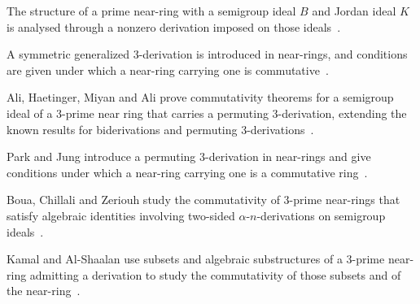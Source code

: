 The structure of a prime near-ring with a semigroup ideal $B$ and Jordan ideal $K$ is analysed through a nonzero derivation imposed on those ideals~\cite{WlStructuralPropertiesOfPrimeNea2019}.

A symmetric generalized 3-derivation is introduced in near-rings, and conditions are given under which a near-ring carrying one is commutative~\cite{WlOnSymmetricGeneralized3Derivat2016}.

Ali, Haetinger, Miyan and Ali prove commutativity theorems for a semigroup ideal of a 3-prime near ring that carries a permuting 3-derivation, extending the known results for biderivations and permuting 3-derivations~\cite{WlSemigroupIdealsAndPermuting3De2015}.

Park and Jung introduce a permuting 3-derivation in near-rings and give conditions under which a near-ring carrying one is a commutative ring~\cite{WlOnPermuting3DerivationsAndComm2010}.

Boua, Chillali and Zeriouh study the commutativity of 3-prime near-rings that satisfy algebraic identities involving two-sided $\alpha$-$n$-derivations on semigroup ideals~\cite{WlDifferentialConditionsForWhich2018}.

Kamal and Al-Shaalan use subsets and algebraic substructures of a 3-prime near-ring admitting a derivation to study the commutativity of those subsets and of the near-ring~\cite{WlCommutativityOfNearRingsWithDe2012}.

